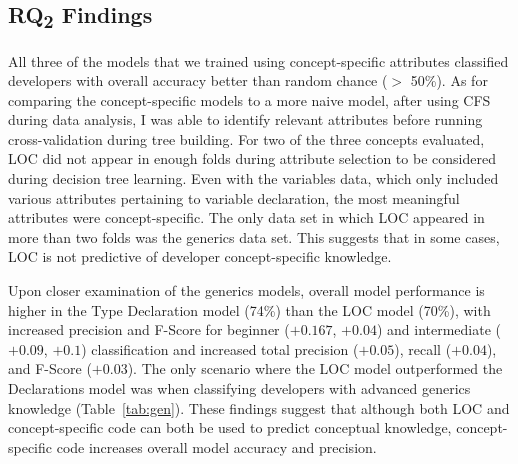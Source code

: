 \vspace{1em}

\vspace{0.5em}


\subsection{RQ\textsubscript{2} Findings}

All three of the models that we trained using concept-specific attributes classified developers with overall accuracy better than random chance ($>$ 50\%).
As for comparing the concept-specific models to a more naive model, after using CFS during data analysis, I was able to identify relevant attributes before running cross-validation during tree building. For two of the three concepts evaluated, LOC did not appear in enough folds during attribute selection to be considered during decision tree learning. Even with the variables data, which only included various attributes pertaining to variable declaration, the most meaningful attributes were concept-specific. The only data set in which LOC appeared in more than two folds was the generics data set. This suggests that in some cases, LOC is not predictive of developer concept-specific knowledge.

Upon closer examination of the generics models, overall model performance is higher in the Type Declaration model (74\%) than the LOC model (70\%), with increased precision and F-Score for beginner (\(+ 0.167\), \(+ 0.04\)) and intermediate (\(+ 0.09\), \(+ 0.1\)) classification and increased total precision (\(+ 0.05\)), recall (\(+ 0.04\)), and F-Score (\(+ 0.03\)). 
The only scenario where the LOC model outperformed the Declarations model was when classifying developers with advanced generics knowledge (Table~\ref{tab:gen}). 
These findings suggest that although both LOC and concept-specific code can both be used to predict conceptual knowledge, concept-specific code increases overall model accuracy and precision.

\vspace{1em}

\vspace{0.5em}


